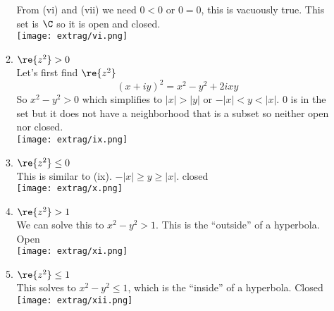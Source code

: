 \documentclass{article}
\begin{document}
\begin{enumerate}
\begin{enumerate}[label=(\roman*)]
          From (vi) and (vii) we need $0<0$ or $0=0$, this is vacuously true. This set is $\C$ so it is open and closed.
          \\\texttt{[image: extrag/vi.png]}
        \item $\re{z^2}>0$\\
          Let's first find $\re{z^2}$
          \[(x+iy)^2=x^2-y^2+2ixy\]
          So $x^2-y^2>0$ which simplifies to $|x|>|y|$ or $-|x|<y<|x|$. 0 is in the set but it does not have a neighborhood that is a subset so neither open nor closed.
          \\\texttt{[image: extrag/ix.png]}
        \item $\re{z^2}\leq0$\\
          This is similar to (ix). $-|x|\geq y\geq|x|$. closed
          \\\texttt{[image: extrag/x.png]}
        \item $\re{z^2}>1$\\
          We can solve this to $x^2-y^2>1$. This is the ``outside'' of a hyperbola. Open
          \\\texttt{[image: extrag/xi.png]}
        \item $\re{z^2}\leq1$\\
          This solves to $x^2-y^2\leq1$, which is the ``inside'' of a hyperbola. Closed
          \\\texttt{[image: extrag/xii.png]}
      \end{enumerate}
  \end{enumerate}
\end{document}
